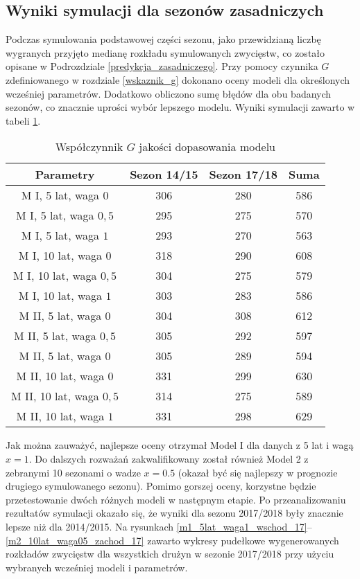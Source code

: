 \documentclass[inzynierska]{pwr_wmat_praca_dyplomowa}
\theoremstyle{plain}
\numberwithin{theorem}{chapter}
\theoremstyle{definition}
\numberwithin{theorem}{chapter}
\begin{document}
\subsection{Wyniki symulacji dla sezonów zasadniczych}
Podczas symulowania podstawowej części sezonu, jako przewidzianą liczbę wygranych przyjęto medianę rozkładu symulowanych zwycięstw, co zostało opisane w Podrozdziale \ref{predykcja_zasadniczego}. Przy pomocy czynnika $G$ zdefiniowanego w rozdziale \ref{wskaznik_g} dokonano oceny modeli dla określonych wcześniej parametrów. Dodatkowo obliczono sumę błędów dla obu badanych sezonów, co znacznie uprości wybór lepszego modelu. Wyniki symulacji zawarto w tabeli \ref{tabela_porownianie_modeli}.
\begin{table}[]
	\centering
	\begin{tabular}{|c|c|c|c|}
		\hline
		\textbf{Parametry} & \textbf{Sezon 14/15} & \textbf{Sezon 17/18} & \textbf{Suma} \\ \hline
		M I, 5 lat, waga $0$ & 306  & 280 & 586\\ \hline
		M I, 5 lat, waga $0,5$ & 295 & 275 & 570 \\ \hline
		M I, 5 lat, waga $1$ & 293 & 270 & 563\\ \hline
		M I, 10 lat, waga $0$ & 318 & 290 & 608\\ \hline
		M I, 10 lat, waga $0,5$ & 304 & 275 & 579\\ \hline
		M I, 10 lat, waga $1$ & 303 & 283 & 586\\ \hline
		M II, 5 lat, waga $0$ &  304 & 308 & 612\\ \hline
		M II, 5 lat, waga $0,5$ & 305 & 292 & 597\\ \hline
		M II, 5 lat, waga $0$ & 305 & 289 & 594\\ \hline
		M II, 10 lat, waga $0$ & 331 & 299 & 630\\ \hline
		M II, 10 lat, waga $0,5$& 314 & 275 & 589 \\ \hline
		M II, 10 lat, waga $1$ & 331 & 298 & 629 \\ \hline
	\end{tabular}
	\caption{Współczynnik $G$ jakości dopasowania modelu}\label{tabela_porownianie_modeli}	
\end{table}
Jak można zauważyć, najlepsze oceny otrzymał Model I dla danych z 5 lat i wagą $x=1$. Do dalszych rozważań zakwalifikowany został również Model 2 z zebranymi 10 sezonami o wadze $x=0.5$ (okazał być się najlepszy w prognozie drugiego symulowanego sezonu). Pomimo gorszej oceny, korzystne będzie przetestowanie dwóch różnych modeli w następnym etapie. Po przeanalizowaniu rezultatów symulacji okazało się, że wyniki dla sezonu 2017/2018 były znacznie lepsze niż dla 2014/2015. Na rysunkach \ref{m1_5lat_waga1_wschod_17}--\ref{m2_10lat_waga05_zachod_17} zawarto wykresy pudełkowe wygenerowanych rozkładów zwycięstw dla wszystkich drużyn w sezonie 2017/2018 przy użyciu wybranych wcześniej modeli i parametrów. 
\end{document}
